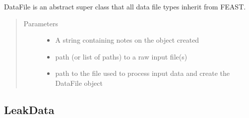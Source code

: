 \documentclass[letterpaper,10pt,english]{sphinxmanual}
\begin{document}
\begin{fulllineitems}
\label{\detokenize{index:feast.input_data_classes.DataFile}}
DataFile is an abstract super class that all data file types inherit from FEAST.
\begin{quote}\begin{description}
\item[{Parameters}] \leavevmode\begin{itemize}
\item {} 
 \textendash{} A string containing notes on the object created

\item {} 
 \textendash{} path (or list of paths) to a raw input file(s)

\item {} 
 \textendash{} path to the file used to process input data and create the DataFile object

\end{itemize}

\end{description}\end{quote}

\end{fulllineitems}



\subsection{LeakData}
\label{\detokenize{index:leakdata}}
\end{document}
